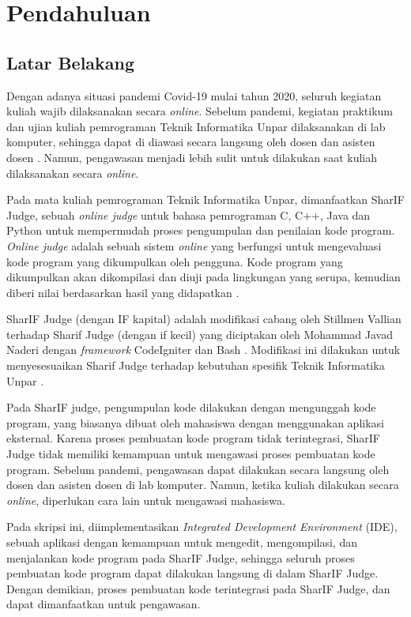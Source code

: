 \chapter{Pendahuluan}
\label{chap:intro}
   
\section{Latar Belakang}
\label{sec:label}

Dengan adanya situasi pandemi Covid-19 mulai tahun 2020, seluruh kegiatan kuliah wajib dilaksanakan secara \textit{online}. Sebelum pandemi, kegiatan praktikum dan ujian kuliah pemrograman Teknik Informatika Unpar dilaksanakan di lab komputer, sehingga dapat di diawasi secara langsung oleh dosen dan asisten dosen .  Namun, pengawasan menjadi lebih sulit untuk dilakukan saat kuliah dilaksanakan secara \textit{online}. 

Pada mata kuliah pemrograman Teknik Informatika Unpar, dimanfaatkan SharIF Judge, sebuah \textit{online judge} untuk bahasa pemrograman C, C++, Java dan Python untuk mempermudah proses pengumpulan dan penilaian kode program. \textit{Online judge} adalah sebuah sistem \textit{online} yang berfungsi untuk mengevaluasi kode program yang dikumpulkan oleh pengguna. Kode program yang dikumpulkan akan dikompilasi dan diuji pada lingkungan yang serupa, kemudian diberi nilai berdasarkan hasil yang didapatkan \cite{judge}.

SharIF Judge (dengan IF kapital) adalah modifikasi cabang oleh Stillmen Vallian terhadap Sharif Judge (dengan if kecil) yang diciptakan oleh Mohammad Javad Naderi dengan \textit{framework} CodeIgniter dan Bash \cite{sharif}. Modifikasi ini dilakukan untuk menyesesuaikan Sharif Judge terhadap kebutuhan spesifik Teknik Informatika Unpar \cite{stillmen:sharif}.

Pada SharIF judge, pengumpulan kode dilakukan dengan mengunggah kode program, yang biasanya dibuat oleh mahasiswa dengan menggunakan aplikasi eksternal. Karena proses pembuatan kode program tidak terintegrasi, SharIF Judge tidak memiliki kemampuan untuk mengawasi proses pembuatan kode program. Sebelum pandemi, pengawasan dapat dilakukan secara langsung oleh dosen dan asisten dosen di lab komputer. Namun, ketika kuliah dilakukan secara \textit{online}, diperlukan cara lain untuk mengawasi mahasiswa. 

Pada skripsi ini, diimplementasikan {\it Integrated Development Environment} (IDE), sebuah aplikasi dengan kemampuan untuk mengedit, mengompilasi, dan menjalankan kode program \cite{ide} pada SharIF Judge, sehingga seluruh proses pembuatan kode program dapat dilakukan langsung di dalam SharIF Judge. Dengan demikian, proses pembuatan kode terintegrasi pada SharIF Judge, dan dapat dimanfaatkan untuk pengawasan.

